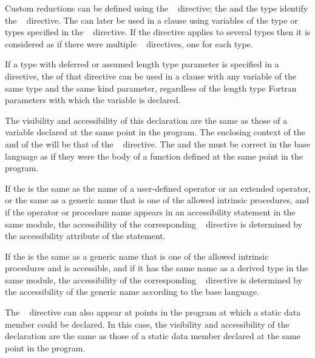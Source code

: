 \descr
Custom reductions can be defined using the ~ directive; the 
 and the type identify the ~ directive. The 
 can later be used in a  clause using variables of the 
type or types specified in the ~ directive. If the directive applies 
to several types then it is considered as if there were multiple ~ 
directives, one for each type.

\fortranspecificstart
If a type with deferred or assumed length type parameter is specified in a ~ directive, the  of that directive can be used in a  clause with any variable of the same type and the same kind parameter, regardless of the length type Fortran parameters with which the variable is declared.
\fortranspecificend

The visibility and accessibility of this declaration are the same as those of a variable 
declared at the same point in the program. The enclosing context of the  and of 
the  will be that of the ~ directive. The  
and the  must be correct in the base language as if they were the body of 
a function defined at the same point in the program.

\fortranspecificstart
If the  is the same as the name of a user-defined operator or an extended operator, or the same as a generic name that is one of the allowed intrinsic procedures, and if the operator or procedure name appears in an accessibility statement in the same module, the accessibility of the corresponding ~ directive is determined by the accessibility attribute of the statement.

If the  is the same as a generic name that is one of the allowed intrinsic procedures and is accessible, and if it has the same name as a derived type in the same module, the accessibility of the corresponding ~ directive is determined by the accessibility of the generic name according to the base language.
\fortranspecificend

\cppspecificstart
The ~ directive can also appear at points in the program at which 
a static data member could be declared. In this case, the visibility and accessibility of 
the declaration are the same as those of a static data member declared at the same point 
in the program.
\cppspecificend

